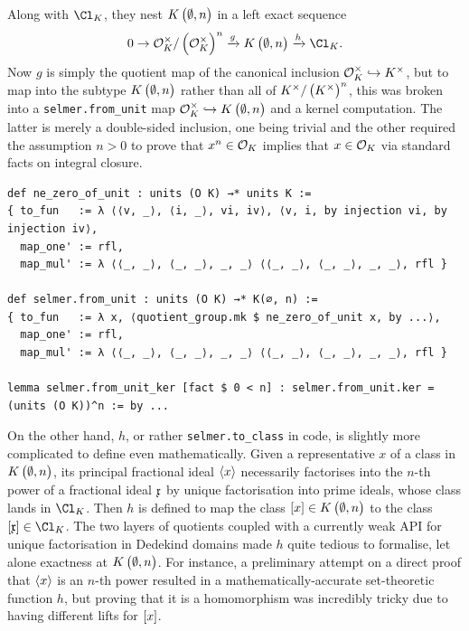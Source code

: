 Along with $ \Cl_K $, they nest $ K\br{\emptyset, n} $ in a left exact sequence
$$ 0 \to \OOO_K^\times / \br{\OOO_K^\times}^n \xrightarrow{g} K\br{\emptyset, n} \xrightarrow{h} \Cl_K. $$
Now $ g $ is simply the quotient map of the canonical inclusion $ \mathcal{O}_K^\times \hookrightarrow K^\times $, but to map into the subtype $ K\br{\emptyset, n} $ rather than all of $ K^\times / \br{K^\times}^n $, this was broken into a \texttt{selmer.from\_unit} map $ \OOO_K^\times \hookrightarrow K\br{\emptyset, n} $ and a kernel computation. The latter is merely a double-sided inclusion, one being trivial and the other required the assumption $ n > 0 $ to prove that $ x^n \in \mathcal{O}_K $ implies that $ x \in \mathcal{O}_K $ via standard facts on integral closure.

\begin{lstlisting}[frame=single]
def ne_zero_of_unit : units (O K) →* units K :=
{ to_fun   := λ ⟨⟨v, _⟩, ⟨i, _⟩, vi, iv⟩, ⟨v, i, by injection vi, by injection iv⟩,
  map_one' := rfl,
  map_mul' := λ ⟨⟨_, _⟩, ⟨_, _⟩, _, _⟩ ⟨⟨_, _⟩, ⟨_, _⟩, _, _⟩, rfl }

def selmer.from_unit : units (O K) →* K(∅, n) :=
{ to_fun   := λ x, ⟨quotient_group.mk $ ne_zero_of_unit x, by ...⟩,
  map_one' := rfl,
  map_mul' := λ ⟨⟨_, _⟩, ⟨_, _⟩, _, _⟩ ⟨⟨_, _⟩, ⟨_, _⟩, _, _⟩, rfl }

lemma selmer.from_unit_ker [fact $ 0 < n] : selmer.from_unit.ker = (units (O K))^n := by ...
\end{lstlisting}

\pagebreak

On the other hand, $ h $, or rather \texttt{selmer.to\_class} in code, is slightly more complicated to define even mathematically. Given a representative $ x $ of a class in $ K\br{\emptyset, n} $, its principal fractional ideal $ \left\langle x \right\rangle $ necessarily factorises into the $ n $-th power of a fractional ideal $ \mathfrak{x} $ by unique factorisation into prime ideals, whose class lands in $ \Cl_K $. Then $ h $ is defined to map the class $ \sbr{x} \in K\br{\emptyset, n} $ to the class $ \sbr{\xxx} \in \Cl_K $. The two layers of quotients coupled with a currently weak API for unique factorisation in Dedekind domains made $ h $ quite tedious to formalise, let alone exactness at $ K\br{\emptyset, n} $. For instance, a preliminary attempt on a direct proof that $ \left\langle x \right\rangle $ is an $ n $-th power resulted in a mathematically-accurate set-theoretic function $ h $, but proving that it is a homomorphism was incredibly tricky due to having different lifts for $ \sbr{x} $.


